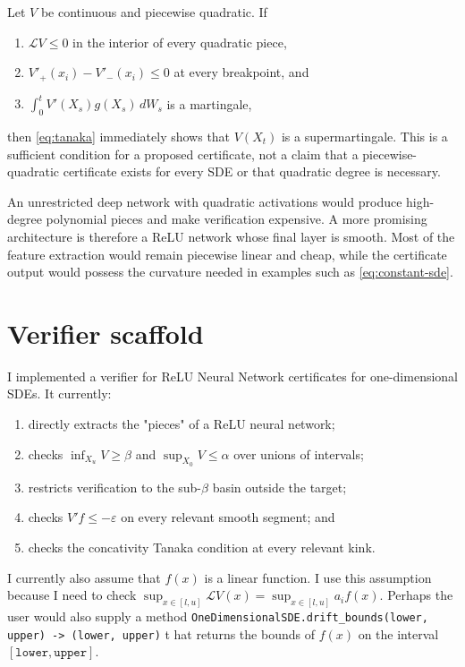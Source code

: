 \documentclass[10pt]{extarticle}
\begin{document}
Let $V$ be continuous and piecewise quadratic.  If
\begin{enumerate}
  \item $\mathcal LV\leq0$ in the interior of every quadratic piece,
  \item $V'_+(x_i)-V'_-(x_i)\leq0$ at every breakpoint, and
  \item $\int_0^tV'(X_s)g(X_s)\,dW_s$ is a martingale,
\end{enumerate}
then \eqref{eq:tanaka} immediately shows that $V(X_t)$ is a supermartingale.
This is a sufficient condition for a proposed certificate, not a claim that a
piecewise-quadratic certificate exists for every SDE or that quadratic degree
is necessary.

An unrestricted deep network with quadratic activations would produce
high-degree polynomial pieces and make verification expensive.  A more
promising architecture is therefore a ReLU network whose final layer is
smooth.  Most of the feature extraction would remain piecewise linear and
cheap, while the certificate output would possess the curvature needed in
examples such as \eqref{eq:constant-sde}.

\section{Verifier scaffold}

I implemented a verifier for ReLU Neural Network certificates for
one-dimensional SDEs.  It currently:
\begin{enumerate}
  \item directly extracts the "pieces" of a ReLU neural network;
  \item checks $\inf_{X_u}V\geq\beta$ and
        $\sup_{X_0}V\leq\alpha$ over unions of intervals;
  \item restricts verification to the sub-$\beta$ basin outside the target;
  \item checks $V'f\leq-\varepsilon$ on every relevant smooth segment; and
  \item checks the concativity Tanaka condition at every relevant kink.
\end{enumerate}

I currently also assume that $f(x)$ is a linear function. I use this assumption 
because I need to check $\sup_{x \in [l, u]} \mathcal{L}V(x) = \sup_{x \in [l, u]} a_i f(x)$.
Perhaps the user would also supply a method \texttt{OneDimensionalSDE.drift\_bounds(lower, upper) -> (lower, upper)} t
hat returns the bounds of $f(x)$ on the interval $[\texttt{lower}, \texttt{upper}]$.
\end{document}
